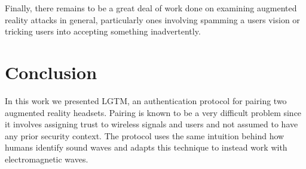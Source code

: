 \documentclass[12pt]{report}
\begin{document}

Finally, there remains to be a great deal of work done on examining augmented reality attacks in general, particularly ones involving spamming a users vision or tricking users into accepting something inadvertently. \par


\section{Conclusion}
In this work we presented LGTM, an authentication protocol for pairing two augmented reality headsets. Pairing is known to be a very difficult problem since it involves assigning trust to wireless signals and users and not assumed to have any prior security context. The protocol uses the same intuition behind how humans identify sound waves and adapts this technique to instead work with electromagnetic waves. \par


%
%

%






%


\end{document}
